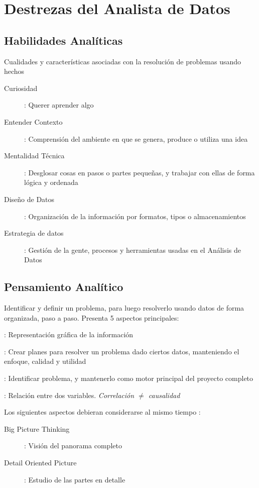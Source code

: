 \section{Destrezas del Analista de Datos}

\subsection{Habilidades Analíticas}
Cualidades y características asociadas con la resolución de problemas usando hechos
\begin{description}
    \item[Curiosidad] : Querer aprender algo
    \item[Entender Contexto] : Comprensión del ambiente en que se genera, produce o utiliza una idea
    \item[Mentalidad Técnica] : Desglosar cosas en pasos o partes pequeñas, y trabajar con ellas de forma lógica y ordenada
    \item[Diseño de Datos] : Organización de la información por formatos, tipos o almacenamientos
    \item[Estrategia de datos] : Gestión de la gente, procesos y herramientas usadas en el Análisis de Datos
\end{description}

\subsection{Pensamiento Analítico}
Identificar y definir un problema, para luego resolverlo usando datos de forma organizada, paso a paso. Presenta 5 aspectos principales:
\begin{description}
    \item[Visualización] : Representación gráfica de la información
    \item[Ser Estratégico] : Crear planes para resolver un problema dado ciertos datos, manteniendo el enfoque, calidad y utilidad
    \item[Pensamiento Orientado a Problemas] : Identificar problema, y mantenerlo como motor principal del proyecto completo
    \item[Correlación] : Relación entre dos variables. \textit{Correlación ${\neq}$ causalidad}
    \item{Los siguientes aspectos debieran considerarse al mismo tiempo :
    \begin{description}
        \item[Big Picture Thinking] : Visión del panorama completo
        \item[Detail Oriented Picture] : Estudio de las partes en detalle
    \end{description}}
\end{description}

